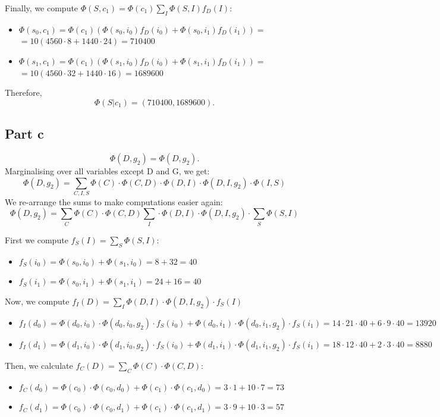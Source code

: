 \documentclass[11pt,a4paper]{article}
\begin{document}
	Finally, we compute $\Phi(S, c_1) = \Phi(c_1)  \sum_I \Phi(S, I) f_D(I): $
	\begin{itemize}
		\item $ \Phi(s_0, c_1) = \Phi(c_1) ( \Phi(s_0, i_0) f_D(i_0) + \Phi(s_0, i_1) f_D(i_1))  = $ \\
		$= 10 (4560 \cdot 8 + 1440 \cdot 24) = 710400$
		\item $ \Phi(s_1, c_1) = \Phi(c_1) ( \Phi(s_1, i_0) f_D(i_0) + \Phi(s_1, i_1) f_D(i_1))  = $ \\
		$= 10 (4560 \cdot 32 + 1440 \cdot 16) = 1689600$
	\end{itemize}
	
	Therefore, $$ \Phi(S | c_1) = (710400, 1689600). $$
	
	\subsection*{Part c}
	$$ \Phi(D, g_2) = \Phi(D, g_2).$$
	Marginalising over all variables except D and G, we get:
	$$ \Phi(D, g_2) = \sum_{C,I,S}\Phi(C) \cdot \Phi(C,D) \cdot \Phi(D,I) \cdot \Phi(D,I,g_2) \cdot \Phi(I,S) $$
	We re-arrange the sums to make computations easier again:
	$$ \Phi(D, g_2) = \sum_{C}\Phi(C) \cdot \Phi(C,D) \sum_{I}\cdot \Phi(D,I) \cdot \Phi(D,I,g_2) \cdot \sum_{S}\Phi(S, I) $$
	
	First we compute $f_S(I) = \sum_{S}\Phi(S,I) $:   
	\begin{itemize}
		\item $ f_S(i_0) = \Phi(s_0, i_0) +\Phi(s_1, i_0) = 8 + 32 = 40$
		\item $ f_S(i_1) = \Phi(s_0, i_1) +\Phi(s_1, i_1) = 24 + 16 = 40$
	\end{itemize}  
	
	Now, we compute $f_I(D) = \sum_{I} \Phi(D,I) \cdot \Phi(D,I,g_2) \cdot f_S(I)$ 
	\begin{itemize}
		\item $ f_I(d_0) = \Phi(d_0, i_0) \cdot \Phi(d_0, i_0, g_2) \cdot f_S(i_0) +  \Phi(d_0, i_1) \cdot \Phi(d_0, i_1, g_2) \cdot f_S(i_1) = 14 \cdot 21 \cdot 40 + 6 \cdot 9 \cdot 40 = 13920 $
		\item $ f_I(d_1) = \Phi(d_1, i_0) \cdot \Phi(d_1, i_0, g_2) \cdot f_S(i_0) + \Phi(d_1, i_1) \cdot \Phi(d_1, i_1, g_2) \cdot f_S(i_1) = 18 \cdot 12 \cdot 40 + 2 \cdot 3 \cdot 40 = 8880 $
	\end{itemize}  
	
	Then, we calculate $f_C(D) = \sum_{C} \Phi(C) \cdot \Phi(C,D)$:
	\begin{itemize}
		\item $ f_C(d_0) = \Phi(c_0) \cdot \Phi(c_0, d_0) + \Phi(c_1) \cdot \Phi(c_1, d_0) = 3 \cdot 1 + 10 \cdot 7 = 73 $
		\item $ f_C(d_1) = \Phi(c_0) \cdot \Phi(c_0, d_1) + \Phi(c_1) \cdot \Phi(c_1, d_1) = 3 \cdot 9 + 10 \cdot 3 = 57 $
	\end{itemize}  
	
\end{document}
